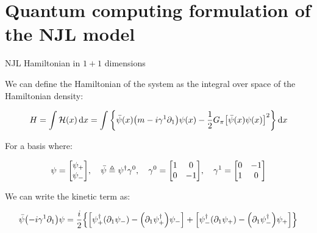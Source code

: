 \documentclass[9pt, aspectratio=169]{beamer}
\begin{document}


\section{Quantum computing formulation of the NJL model}

\begin{frame}{NJL Hamiltonian in $1+1$ dimensions}

	We can define the Hamiltonian of the system as the integral over space of the Hamiltonian density:

	\begin{gather*}
	  H = \int \mathcal{H}(x) \dd{x}
	    = \int \qty{\bar{\psi}(x)\qty(m-i\gamma^{1}\partial_{1})\psi(x) -
	                \frac{1}{2}G_{\pi}\qty[\bar{\psi}(x)\psi(x)]^{2}} \dd{x}
	\end{gather*}

	\pause

	For a basis where:

	\begin{gather*}
		\psi = \mqty[\psi_{+} \\ \psi_{-}] \qc
	  \bar{\psi} \defeq \psi^{\dagger}\gamma^{0} \qc
		\gamma^{0} = \mqty[1 & 0\\ 0 & -1] \qc
	  \gamma^{1} = \mqty[0 & -1\\ 1 & 0]
	\end{gather*}

	We can write the kinetic term as:

	\begin{gather*}
	  \bar{\psi}\qty(-i\gamma^{1}\partial_{1})\psi =
			\frac{i}{2} \qty{
	      \qty[ \psi^{\dagger}_{+} \qty(\partial_{1}\psi_{-}) -
	      \qty(\partial_{1}\psi^{\dagger}_{+}) \psi_{-} ] +
	      \qty[ \psi^{\dagger}_{-} \qty(\partial_{1}\psi_{+}) -
	      \qty(\partial_{1}\psi^{\dagger}_{-}) \psi_{+} ]
	    }
	\end{gather*}

\end{frame}

\end{document}
